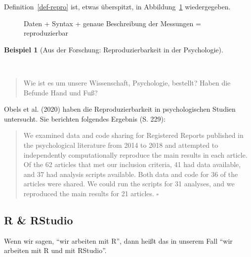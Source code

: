 \documentclass[
  letterpaper,
]{scrbook}
\theoremstyle{definition}
\theoremstyle{definition}
\newtheorem{example}{Beispiel}[chapter]
\theoremstyle{definition}
\theoremstyle{remark}
\begin{document}
Definition~\ref{def-repro} ist, etwas überspitzt, in
Abbildung~\ref{fig-repro} wiedergegeben.

\begin{figure}


\caption{\label{fig-repro}Daten + Syntax + genaue Beschreibung der
Messungen = reproduzierbar}

\end{figure}%

\begin{example}[Aus der Forschung: Reproduzierbarkeit in der
Psychologie]\protect\hypertarget{exm-repro}{}\label{exm-repro}

~

\begin{quote}
{} Wie ist es um unsere Wissenschaft, Psychologie,
bestellt? Haben die Befunde Hand und Fuß?
\end{quote}

Obels et al. (2020) haben die Reproduzierbarkeit in psychologischen
Studien untersucht. Sie berichten folgendes Ergebnis (S. 229):

\begin{quote}
We examined data and code sharing for Registered Reports published in
the psychological literature from 2014 to 2018 and attempted to
independently computationally reproduce the main results in each
article. Of the 62 articles that met our inclusion criteria, 41 had data
available, and 37 had analysis scripts available. Both data and code for
36 of the articles were shared. We could run the scripts for 31
analyses, and we reproduced the main results for 21 articles.
\(\square\)
\end{quote}

\end{example}

\subsection{R \& RStudio}\label{r-rstudio}

Wenn wir sagen, \enquote{wir arbeiten mit R}, dann heißt das in unserem
Fall \enquote{wir arbeiten mit R und mit RStudio}.
\end{document}
